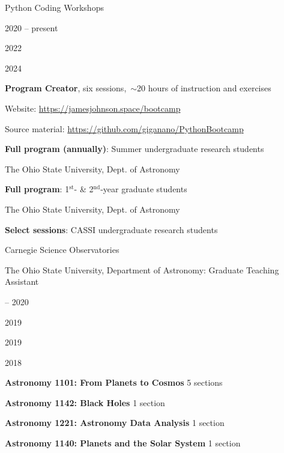 \documentclass[cv.tex]{subfiles}
\begin{document}
{\color{themecolor} \large Python Coding Workshops}
\par\noindent
\parbox{0.18\textwidth}{%
	\vspace{2mm}
	\raggedleft
	\null \par
	\null \par
	\null \par
	2020 -- present \par
	\null \par
	2022 \par
	\null \par
	2024 \par
	\null
}
\hspace{1mm}
\parbox{0.73\textwidth}{%
	\textbf{Program Creator}, six sessions,~$\sim$20 hours of instruction
	and exercises \par
	Website: {\small \url{https://jamesjohnson.space/bootcamp}} \par
	Source material:
	{\small \url{https://github.com/giganano/PythonBootcamp}} \par
	\textbf{Full program (annually)}: Summer undergraduate research students \par
	The Ohio State University, Dept. of Astronomy \par
	\textbf{Full program}: 1$^\text{st}$- \& 2$^\text{nd}$-year graduate
	students \par
	The Ohio State University, Dept. of Astronomy \par
	\textbf{Select sessions}: CASSI undergraduate research students \par
	Carnegie Science Observatories
}

\vspace{4mm}
\noindent
{\color{themecolor} \large The Ohio State University, Department of Astronomy:
Graduate Teaching Assistant}
\par\noindent
\parbox{0.18\textwidth}{%
	 -- 2020 \par
	2019 \par
	2019 \par
	2018
}
\hspace{1mm}
\parbox{0.8\textwidth}{%
	\vspace{1mm}
	\textbf{Astronomy 1101: From Planets to Cosmos} \hfill 5 sections \par
	\textbf{Astronomy 1142: Black Holes} \hfill 1 section \par
	\textbf{Astronomy 1221: Astronomy Data Analysis} \hfill 1 section \par
	\textbf{Astronomy 1140: Planets and the Solar System} \hfill 1 section \par
}
\end{document}
